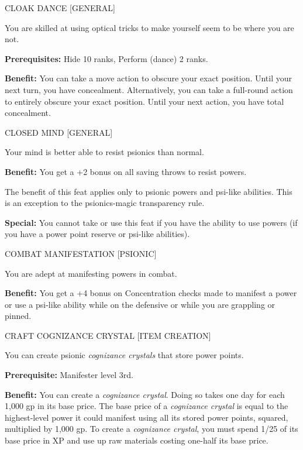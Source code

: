 \documentclass{article}
\begin{document}
\vspace{12pt}
CLOAK DANCE [GENERAL]

You are skilled at using optical tricks to make yourself seem to be where you are 
not.

\textbf{Prerequisites:} Hide 10 ranks, Perform (dance) 2 ranks.

\textbf{Benefit:} You can take a move action to obscure your exact position. Until 
your next turn, you have concealment. Alternatively, you can take a full-round 
action to entirely obscure your exact position. Until your next action, you have 
total concealment.

\vspace{12pt}
CLOSED MIND [GENERAL]

Your mind is better able to resist psionics than normal.

\textbf{Benefit:} You get a +2 bonus on all saving throws to resist powers.

The benefit of this feat applies only to psionic powers and psi-like abilities. 
This is an exception to the psionics-magic transparency rule.

\textbf{Special:} You cannot take or use this feat if you have the ability to use 
powers (if you have a power point reserve or psi-like abilities).

\vspace{12pt}
COMBAT MANIFESTATION [PSIONIC]

You are adept at manifesting powers in combat.

\textbf{Benefit:} You get a +4 bonus on Concentration checks made to manifest a 
power or use a psi-like ability while on the defensive or while you are grappling 
or pinned.

\vspace{12pt}
CRAFT COGNIZANCE CRYSTAL [ITEM CREATION]

You can create psionic \textit{cognizance crystals }that store power points.

\textbf{Prerequisite: }Manifester level 3rd.

\textbf{Benefit:} You can create a \textit{cognizance crystal}. Doing so takes 
one day for each 1,000 gp in its base price. The base price of a \textit{cognizance 
crystal }is equal to the highest-level power it could manifest using all its stored 
power points, squared, multiplied by 1,000 gp. To create a \textit{cognizance crystal}, 
you must spend 1/25 of its base price in XP and use up raw materials costing one-half 
its base price.
\end{document}

